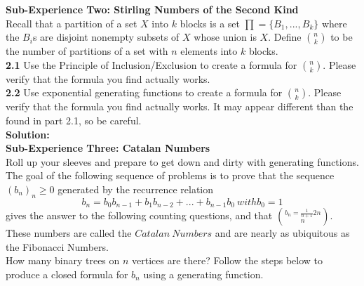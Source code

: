 \documentclass[10pt,a4paper]{report}
\begin{document}
	
	\textbf{Sub-Experience Two: Stirling Numbers of the Second Kind}\\
	Recall that a partition of a set $X$ into $k$ blocks is a set $\prod = \{B_1,...,B_k\}$ where the $B_i$s are disjoint nonempty subsets of $X$ whose union is $X$. Define ${n}\choose{k}$ to be the number of partitions of a set with $n$ elements into $k$ blocks.\\
	\textbf{2.1} Use the Principle of Inclusion/Exclusion to create a formula for ${n}\choose{k}$.  Please verify that the formula you find actually works.\\
	\textbf{2.2} Use exponential generating functions to create a formula for ${n}\choose{k}$.  Please verify that the formula you find actually works.  It may appear different than the found in part 2.1, so be careful.\\
	\textbf{Solution: }\\
	\newline
	\textbf{Sub-Experience Three: Catalan Numbers}\\
	Roll up your sleeves and prepare to get down and dirty with generating functions.  The goal of the following sequence of problems is to prove that the sequence $(b_n)_n\geq0$ generated by the recurrence relation\\
	\[b_n = b_0b_{n-1} + b_1b_{n-2} + ... + b_{n-1}b_0\ with b_0 = 1\]
	gives the answer to the following counting questions, and that $b_n = \frac{1}{n+1}{2n}\choose{n}$.  These numbers are called the $Catalan\ Numbers$ and are nearly as ubiquitous as the Fibonacci Numbers.\\
	\newline
	How many binary trees on $n$ vertices are there?  Follow the steps below to produce a closed formula for $b_n$ using a generating function.\\
	
\end{document}
